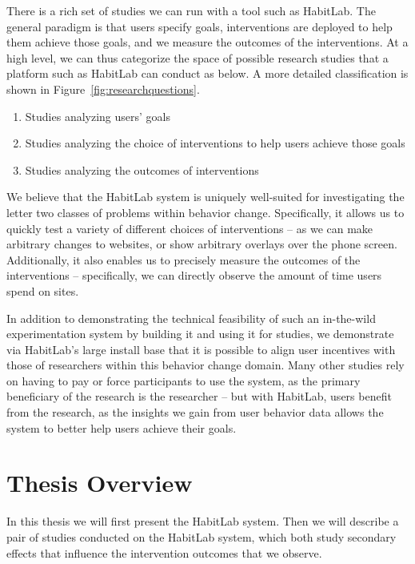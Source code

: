 There is a rich set of studies we can run with a tool such as HabitLab. The general paradigm is that users specify goals, interventions are deployed to help them achieve those goals, and we measure the outcomes of the interventions. At a high level, we can thus categorize the space of possible research studies that a platform such as HabitLab can conduct as below. A more detailed classification is shown in Figure~\ref{fig:researchquestions}.

\begin{enumerate}
\item Studies analyzing users' goals
\item Studies analyzing the choice of interventions to help users achieve those goals
\item Studies analyzing the outcomes of interventions
\end{enumerate}

We believe that the HabitLab system is uniquely well-suited for investigating the letter two classes of problems within behavior change. Specifically, it allows us to quickly test a variety of different choices of interventions -- as we can make arbitrary changes to websites, or show arbitrary overlays over the phone screen. Additionally, it also enables us to precisely measure the outcomes of the interventions -- specifically, we can directly observe the amount of time users spend on sites.

In addition to demonstrating the technical feasibility of such an in-the-wild experimentation system by building it and using it for studies, we demonstrate via HabitLab's large install base that it is possible to align user incentives with those of researchers within this behavior change domain. Many other studies rely on having to pay or force participants to use the system, as the primary beneficiary of the research is the researcher -- but with HabitLab, users benefit from the research, as the insights we gain from user behavior data allows the system to better help users achieve their goals.

 

\section{Thesis Overview}

In this thesis we will first present the HabitLab system. Then we will describe a pair of studies conducted on the HabitLab system, which both study secondary effects that influence the intervention outcomes that we observe. %

